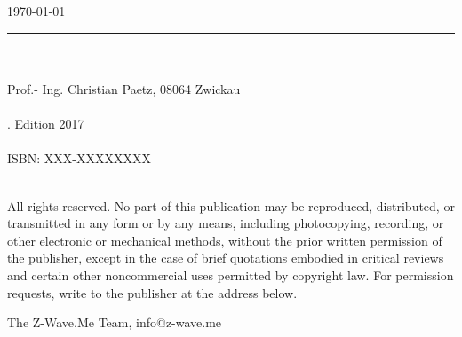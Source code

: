 \documentclass[10pt, bibtotoc, pointlessnumbers, twoside=false, normalheadings]{scrbook}
\begin{document}
\begin{titlepage}
\\ 
		\vspace{10mm}
		\\ 
		\vspace{10mm}
	
		\vspace{\fill}	
\date{\today}  	
		\centering \large{\today}\\

\end{titlepage}
\newpage{}
\thispagestyle {empty}


\begin{center}
  

\end{center}
\null\vfill
\noindent\rule{\textwidth}{1pt}
\\
\\
\noindent
\textcopyright  {} Prof.- Ing. Christian Paetz, 08064 Zwickau \\
\\
. Edition 2017 \\
\\
\noindent ISBN: XXX-XXXXXXXX \\
\\
\begin{scriptsize}
\noindent
All rights reserved. No part of this publication may be reproduced, distributed, or 
transmitted in any form or by any means, including photocopying, recording, or other 
electronic or mechanical methods, without the prior written permission of the publisher, 
except in the case of brief quotations embodied in critical reviews and certain other 
noncommercial uses permitted by copyright law. For permission requests, write to the 
publisher at the address below.


\noindent
The Z-Wave.Me Team, info@z-wave.me


\end{scriptsize}
\newpage{}		
		

\newpage{}
\tableofcontents
 
 
 
 
 
 
 



\end{document}
